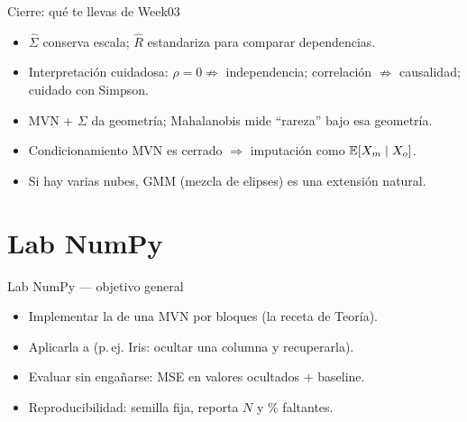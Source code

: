 \begin{frame}{Cierre: qué te llevas de Week03}
\begin{itemize}
  \item \(\hat{\Sigma}\) conserva escala; \(\hat{R}\) estandariza para comparar dependencias.
  \item Interpretación cuidadosa: \(\rho=0\not\Rightarrow\) independencia; correlación \(\not\Rightarrow\) causalidad; cuidado con Simpson.
  \item MVN + \(\Sigma\) da geometría; Mahalanobis mide “rareza” bajo esa geometría.
  \item Condicionamiento MVN es cerrado \(\Rightarrow\) imputación como \(\mathbb{E}[X_m\mid X_o]\).
  \item Si hay varias nubes, GMM (mezcla de elipses) es una extensión natural.
\end{itemize}
\end{frame}

\section[Lab NumPy]{Lab NumPy\label{sec:labnumpy}}

\begin{frame}{Lab NumPy — objetivo general}
\begin{itemize}
  \item Implementar la  de una MVN por bloques (la receta de Teoría).
  \item Aplicarla a  (p.\,ej. Iris: ocultar una columna y recuperarla).
  \item Evaluar sin engañarse: MSE  en valores ocultados + baseline.
  \item Reproducibilidad: semilla fija, reporta \(N\) y \% faltantes.
\end{itemize}
\end{frame}

